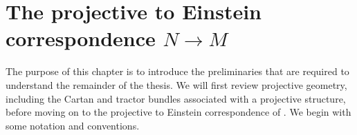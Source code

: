 
\chapter{The projective to Einstein correspondence $N\rightarrow M$}
\label{chap:intro2}

The purpose of this chapter is to introduce the preliminaries that are required to understand the remainder of the thesis. We will first review projective geometry, including the Cartan and tractor bundles associated with a projective structure, before moving on to the projective to Einstein correspondence of \cite{DM}. We begin with some notation and conventions.


